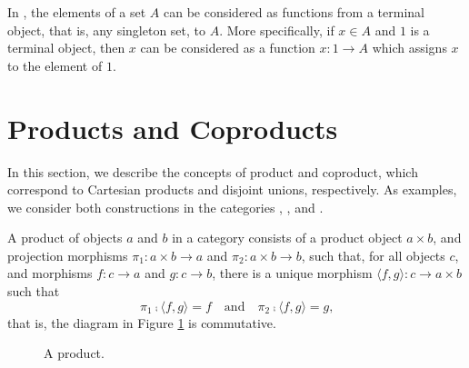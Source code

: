 \begin{example}
  \label{ex:terminal-objects-constants}


  In \set, the elements of a set $A$ can be considered as functions
  from a terminal object, that is, any singleton set, to $A$. More
  specifically, if $x \in A$ and $1$ is a terminal object, then $x$
  can be considered as a function $x: 1 \to A$ which assigns $x$ to
  the element of $1$.

\end{example}

\section{Products and Coproducts}
\label{sec:constructions-products-coproducts}

In this section, we describe the concepts of product and coproduct,
which correspond to Cartesian products and disjoint unions,
respectively. As examples, we consider both constructions in the
categories \set, \hask, and \agda.

\begin{definition}
  \label{def:product}


  A product of objects $a$ and $b$ in a category  consists of a
  product object $a \times b$, and projection morphisms $\pi_{1}: a
  \times b \to a$ and $\pi_{2}: a \times b \to b$, such that, for all
  objects $c$, and morphisms $f: c \to a$ and $g: c \to b$, there is a
  unique morphism $\langle{f,g}\rangle: c \to a \times b$ such that
  \begin{equation}
    \label{eq:product}
    \pi_{1} \comp \langle{f,g}\rangle = f
    \quad
    \text{and}
    \quad
    \pi_{2} \comp \langle{f,g}\rangle = g
    \text{,}
  \end{equation}
  that is, the diagram in Figure \ref{fig:product} is commutative.

  \begin{figure}[htb]
    \begin{center}
    \end{center}
    \caption{A product.}
    \label{fig:product}
  \end{figure}

\end{definition}


